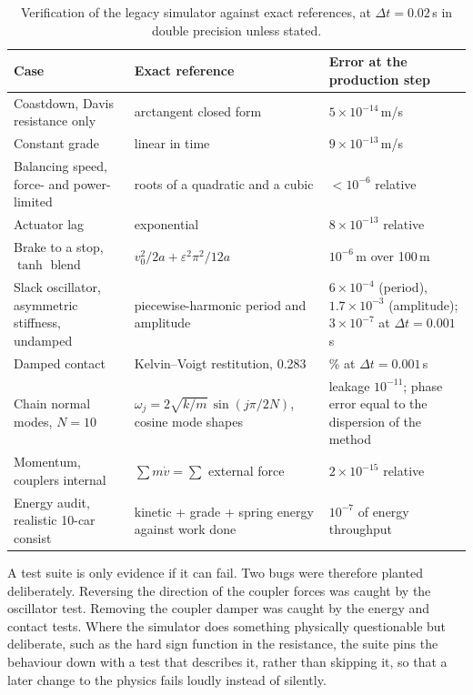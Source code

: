 \begin{table}[htbp]
    \centering
    \small
    \begin{tabular}{>{\raggedright}p{4.2cm}>{\raggedright}p{5.2cm}>{\raggedright\arraybackslash}p{4.2cm}}
        \toprule
        Case & Exact reference & Error at the production step \\
        \midrule
        Coastdown, Davis resistance only & arctangent closed form & $5\times10^{-14}$\,m/s \\
        Constant grade & linear in time & $9\times10^{-13}$\,m/s \\
        Balancing speed, force- and power-limited & roots of a quadratic and a cubic & $< 10^{-6}$ relative \\
        Actuator lag & exponential & $8\times10^{-13}$ relative \\
        Brake to a stop, $\tanh$ blend & $v_0^2/2a + \varepsilon^2\pi^2/12a$ & $10^{-6}$\,m over 100\,m \\
        Slack oscillator, asymmetric stiffness, undamped & piecewise-harmonic period and amplitude & $6\times10^{-4}$ (period), $1.7\times10^{-3}$ (amplitude); $3\times10^{-7}$ at $\Delta t = 0.001$\,s \\
        Damped contact & Kelvin--Voigt restitution, 0.283 & 0.3\% at $\Delta t = 0.001$\,s \\
        Chain normal modes, $N = 10$ & $\omega_j = 2\sqrt{k/m}\,\sin(j\pi/2N)$, cosine mode shapes & leakage $10^{-11}$; phase error equal to the dispersion of the method \\
        Momentum, couplers internal & $\sum m\dot v = \sum$ external force & $2\times10^{-15}$ relative \\
        Energy audit, realistic 10-car consist & kinetic + grade + spring energy against work done & $10^{-7}$ of energy throughput \\
        \bottomrule
    \end{tabular}
    \caption{Verification of the legacy simulator against exact references, at $\Delta t = 0.02$\,s in double precision unless stated.}
    \label{tab:critique_verification}
\end{table}

A test suite is only evidence if it can fail. Two bugs were therefore planted deliberately. Reversing the direction of the coupler forces was caught by the oscillator test. Removing the coupler damper was caught by the energy and contact tests. Where the simulator does something physically questionable but deliberate, such as the hard sign function in the resistance, the suite pins the behaviour down with a test that describes it, rather than skipping it, so that a later change to the physics fails loudly instead of silently.

